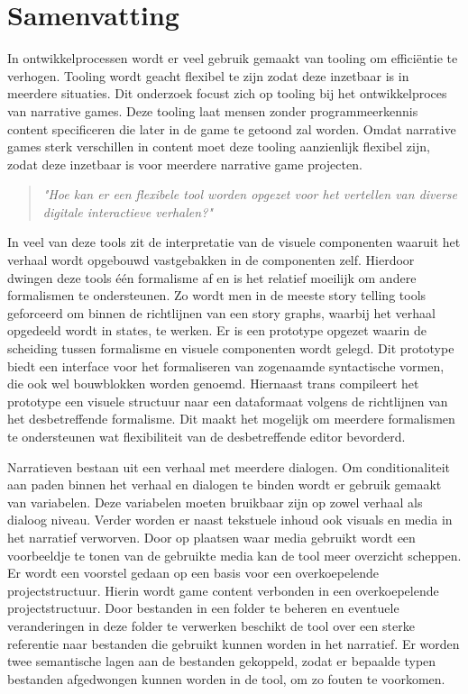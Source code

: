 \chapter*{Samenvatting}
In ontwikkelprocessen wordt er veel gebruik gemaakt van tooling om efficiëntie te verhogen. Tooling wordt geacht flexibel te zijn zodat deze inzetbaar is in meerdere situaties. Dit onderzoek focust zich op tooling bij het ontwikkelproces van narrative games. Deze tooling laat mensen zonder programmeerkennis content specificeren die later in de game te getoond zal worden. Omdat narrative games sterk verschillen in content moet deze tooling aanzienlijk flexibel zijn, zodat deze inzetbaar is voor meerdere narrative game projecten.
\begin{quote} 
    \centering
    \large
    \textit{
        "Hoe kan er een flexibele tool worden opgezet voor het vertellen van diverse digitale interactieve verhalen?"
    }
\end{quote}

In veel van deze tools zit de interpretatie van de visuele componenten waaruit het verhaal wordt opgebouwd vastgebakken in de componenten zelf. Hierdoor dwingen deze tools één formalisme af en is het relatief moeilijk om andere formalismen te ondersteunen. Zo wordt men in de meeste story telling tools geforceerd om binnen de richtlijnen van een story graphs, waarbij het verhaal opgedeeld wordt in states, te werken. Er is een prototype opgezet waarin de scheiding tussen formalisme en visuele componenten wordt gelegd. Dit prototype biedt een interface voor het formaliseren van zogenaamde syntactische vormen, die ook wel bouwblokken worden genoemd. Hiernaast trans compileert het prototype een visuele structuur naar een dataformaat volgens de richtlijnen van het desbetreffende formalisme. Dit maakt het mogelijk om meerdere formalismen te ondersteunen wat flexibiliteit van de desbetreffende editor bevorderd.

Narratieven bestaan uit een verhaal met meerdere dialogen. Om conditionaliteit aan paden binnen het verhaal en dialogen te binden wordt er gebruik gemaakt van variabelen. Deze variabelen moeten bruikbaar zijn op zowel verhaal als dialoog niveau. Verder worden er naast tekstuele inhoud ook visuals en media in het narratief verworven. Door op plaatsen waar media gebruikt wordt een voorbeeldje te tonen van de gebruikte media kan de tool meer overzicht scheppen. Er wordt een voorstel gedaan op een basis voor een overkoepelende projectstructuur. Hierin wordt game content verbonden in een overkoepelende projectstructuur. Door bestanden in een folder te beheren en eventuele veranderingen in deze folder te verwerken beschikt de tool over een sterke referentie naar bestanden die gebruikt kunnen worden in het narratief. Er worden twee semantische lagen aan de bestanden gekoppeld, zodat er bepaalde typen bestanden afgedwongen kunnen worden in de tool, om zo fouten te voorkomen.

